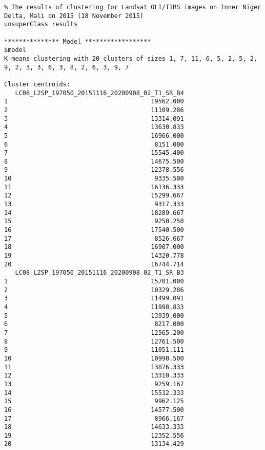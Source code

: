 \begin{scriptsize}
\begin{verbatim}
% The results of clustering for Landsat OLI/TIRS images on Inner Niger Delta, Mali on 2015 (18 November 2015)
unsuperClass results

*************** Model ******************
$model
K-means clustering with 20 clusters of sizes 1, 7, 11, 6, 5, 2, 5, 2, 9, 2, 3, 3, 6, 3, 8, 2, 6, 3, 9, 7

Cluster centroids:
   LC08_L2SP_197050_20151116_20200908_02_T1_SR_B4
1                                       19562.000
2                                       11109.286
3                                       13314.091
4                                       13630.833
5                                       16966.000
6                                        8151.000
7                                       15545.400
8                                       14675.500
9                                       12378.556
10                                       9335.500
11                                      16136.333
12                                      15299.667
13                                       9317.333
14                                      18289.667
15                                       9250.250
16                                      17540.500
17                                       8526.667
18                                      16907.000
19                                      14320.778
20                                      16744.714
   LC08_L2SP_197050_20151116_20200908_02_T1_SR_B3
1                                       15701.000
2                                       10329.286
3                                       11499.091
4                                       11998.833
5                                       13939.000
6                                        8217.000
7                                       12565.200
8                                       12761.500
9                                       11051.111
10                                      10990.500
11                                      13876.333
12                                      13310.333
13                                       9259.167
14                                      15532.333
15                                       9962.125
16                                      14577.500
17                                       8966.167
18                                      14633.333
19                                      12352.556
20                                      13134.429

\end{verbatim}
\end{scriptsize}
